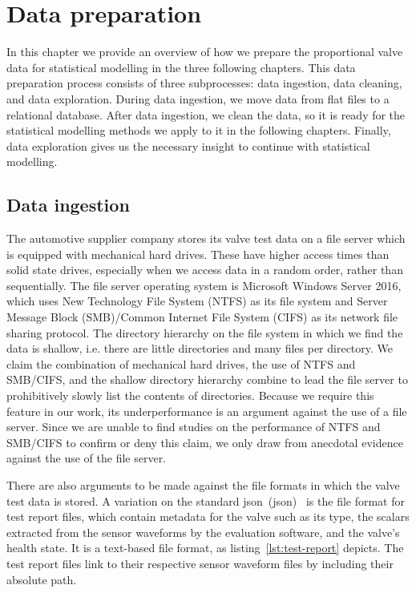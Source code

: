 \chapter{Data preparation}

In this chapter we provide an overview of how we prepare the proportional valve data for statistical modelling in the three following chapters.
This data preparation process consists of three subprocesses: data ingestion, data cleaning, and data exploration.
During data ingestion, we move data from flat files to a relational database.
After data ingestion, we clean the data, so it is ready for the statistical modelling methods we apply to it in the following chapters.
Finally, data exploration gives us the necessary insight to continue with statistical modelling.

\section{Data ingestion}

The automotive supplier company stores its valve test data on a file server which is equipped with mechanical hard drives.
These have higher access times than solid state drives, especially when we access data in a random order, rather than sequentially.
The file server operating system is Microsoft Windows Server 2016, which uses New Technology File System (NTFS) as its file system and Server Message Block (SMB)/Common Internet File System (CIFS) as its network file sharing protocol.
The directory hierarchy on the file system in which we find the data is shallow, i.e. there are little directories and many files per directory.
We claim the combination of mechanical hard drives, the use of NTFS and SMB/CIFS, and the shallow directory hierarchy combine to lead the file server to prohibitively slowly list the contents of directories.
Because we require this feature in our work, its underperformance is an argument against the use of a file server.
Since we are unable to find studies on the performance of NTFS and SMB/CIFS to confirm or deny this claim, we only draw from anecdotal evidence against the use of the file server.

There are also arguments to be made against the file formats in which the valve test data is stored.
A variation on the standard \acrlong{json}~(\acrshort{json})~\citep{DBLP:journals/rfc/rfc8259} is the file format for test report files, which contain metadata for the valve such as its type, the scalars extracted from the sensor waveforms by the evaluation software, and the valve's health state.
It is a text-based file format, as listing~\ref{lst:test-report} depicts.
The test report files link to their respective sensor waveform files by including their absolute path.

